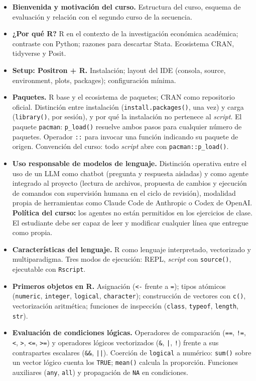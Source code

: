 \documentclass[11pt,letterpaper]{article}
\newcommand{\blue}[1]{{\color{cerulean}#1}}
\newcommand{\orange}[1]{{\color{redorange}#1}}
\begin{document}
\begin{itemize}[leftmargin=*, itemsep=2pt]
    \item \textbf{Bienvenida y motivación del curso.} Estructura del curso, esquema de evaluación y relación con el segundo curso de la secuencia.
    \item \textbf{¿Por qué R?} R en el contexto de la investigación económica académica; contraste con Python; razones para descartar Stata. Ecosistema CRAN, tidyverse y Posit.
    \item \textbf{Setup: Positron + R.} Instalación; layout del IDE (consola, source, environment, plots, packages); configuración mínima.
    \item \textbf{Paquetes.} R base y el ecosistema de paquetes; CRAN como repositorio oficial. Distinción entre instalación (\texttt{install.packages()}, una vez) y carga (\texttt{library()}, por sesión), y por qué la instalación no pertenece al \textit{script}. El paquete \texttt{pacman}: \texttt{p\_load()} resuelve ambos pasos para cualquier número de paquetes. Operador \texttt{::} para invocar una función indicando su paquete de origen. Convención del curso: todo \textit{script} abre con \texttt{pacman::p\_load()}.
    \item \textbf{Uso responsable de modelos de lenguaje.} Distinción operativa entre el uso de un LLM como \blue{chatbot} (pregunta y respuesta aisladas) y como \orange{agente integrado al proyecto} (lectura de archivos, propuesta de cambios y ejecución de comandos con supervisión humana en el ciclo de revisión), modalidad propia de herramientas como Claude Code de Anthropic o Codex de OpenAI. \textbf{Política del curso:} los agentes no están permitidos en los ejercicios de clase. El estudiante debe ser capaz de leer y modificar cualquier línea que entregue como propia.
    \item \textbf{Características del lenguaje.} R como lenguaje interpretado, vectorizado y multiparadigma. Tres modos de ejecución: REPL, \textit{script} con \texttt{source()}, ejecutable con \texttt{Rscript}.
    \item \textbf{Primeros objetos en R.} Asignación (\texttt{<-} frente a \texttt{=}); tipos atómicos (\texttt{numeric}, \texttt{integer}, \texttt{logical}, \texttt{character}); construcción de vectores con \texttt{c()}, vectorización aritmética; funciones de inspección (\texttt{class}, \texttt{typeof}, \texttt{length}, \texttt{str}).
    \item \textbf{Evaluación de condiciones lógicas.} Operadores de comparación (\texttt{==}, \texttt{!=}, \texttt{<}, \texttt{>}, \texttt{<=}, \texttt{>=}) y operadores lógicos vectorizados (\texttt{\&}, \texttt{|}, \texttt{!}) frente a sus contrapartes escalares (\texttt{\&\&}, \texttt{||}). Coerción de \texttt{logical} a numérico: \texttt{sum()} sobre un vector lógico cuenta los \texttt{TRUE}; \texttt{mean()} calcula la proporción. Funciones auxiliares (\texttt{any}, \texttt{all}) y propagación de \texttt{NA} en condiciones.

\end{itemize}
\end{document}
